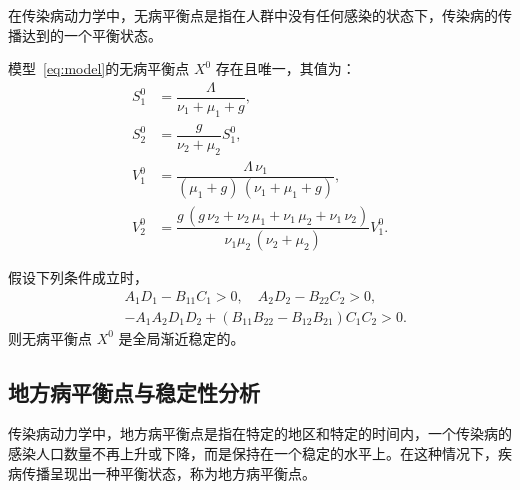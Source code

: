 在传染病动力学中，无病平衡点是指在人群中没有任何感染的状态下，传染病的传播达到的一个平衡状态。

\begin{theorem}[无病平衡点的存在唯一性]
	\label{thm:dfe_eut}
	模型~\eqref{eq:model}的无病平衡点 $X^0$ 存在且唯一，其值为：
	\begin{equation*}
		\begin{aligned}
			S_1^0 & = \dfrac{\Lambda}{\nu_1+\mu_1 +g },                                                \\
			S_2^0 & = \dfrac{g}{\nu_2+\mu_{2}}S_1^0,                                                     \\
			V_1^0 & = \dfrac{\Lambda \,\nu_1 }{{\left(\mu_1+g \right)}\,{\left(\nu_1+\mu_1 +g \right)}}, \\
			V_2^0 & = \dfrac{g\,{\left(g\,\nu_2 + \nu_2\,\mu_1 + \nu_1\,\mu_2 +\nu_1 \,\nu_2 \right)}} {\nu_1 \mu_2 \,{\left(\nu_2+\mu_2 \right)}}V_1^0.
		\end{aligned}
	\end{equation*}
\end{theorem}

\begin{theorem}[无病平衡点的全局稳定性]
	\label{thm:dfe_global_stability}
	假设下列条件成立时，
	\begin{equation*}
		\label{eq:DFE_coefficients_condition}
		\begin{aligned}
			& A_1 D_1 -B_{11} C_1 >0, \quad A_2 D_2 -B_{22} C_2 >0, \\
			& -A_1 A_2 D_1 D_2+\left(B_{11} B_{22} -B_{12} B_{21}\right) C_1 C_2>0.
		\end{aligned}
	\end{equation*}
	则无病平衡点 $X^0$ 是全局渐近稳定的。
\end{theorem}

\subsection{地方病平衡点与稳定性分析} \label{subsec:eep}

传染病动力学中，地方病平衡点是指在特定的地区和特定的时间内，一个传染病的感染人口数量不再上升或下降，而是保持在一个稳定的水平上。在这种情况下，疾病传播呈现出一种平衡状态，称为地方病平衡点。

